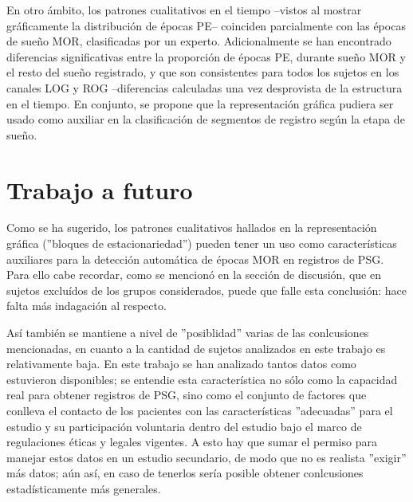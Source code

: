 En otro \'ambito, los
patrones cualitativos en el tiempo --vistos al
mostrar gr\'aficamente la distribuci\'on de \'epocas PE-- coinciden parcialmente con las \'epocas
de sue\~no MOR, clasificadas por un experto.
Adicionalmente se han encontrado diferencias significativas entre la proporci\'on de \'epocas PE,
durante sue\~no MOR y el resto del sue\~no registrado, y que son consistentes para todos los
sujetos en los canales LOG y ROG --diferencias calculadas una vez desprovista de la estructura
en el tiempo. En conjunto, se propone que la representaci\'on gr\'afica pudiera ser usado
como auxiliar en la clasificaci\'on de segmentos de registro seg\'un la etapa de sue\~no.


\section{Trabajo a futuro}

Como se ha sugerido, los patrones cualitativos hallados en la representaci\'on gr\'afica 
(''bloques de estacionariedad'') pueden tener un uso como 
caracter\'isticas auxiliares
para la detecci\'on autom\'atica de \'epocas MOR en registros de PSG.
Para ello cabe recordar, como se mencion\'o 
en la secci\'on de discusi\'on, que en sujetos exclu\'idos de los grupos considerados, puede
que falle esta conclusi\'on: hace falta m\'as indagaci\'on al respecto. 


As\'i tambi\'en se mantiene a nivel de ''posiblidad'' varias de las conlcusiones mencionadas,
en cuanto a la cantidad de sujetos analizados en este trabajo es relativamente baja.
En este trabajo se han analizado tantos datos como estuvieron disponibles;
se entendie esta caracter\'istica no s\'olo como la 
capacidad real para obtener registros de PSG, sino como el conjunto de factores que conlleva
el contacto de los pacientes con las caracter\'isticas ''adecuadas'' para el estudio y su
participaci\'on voluntaria dentro del estudio bajo el marco de regulaciones \'eticas y legales 
vigentes. A esto hay que sumar el permiso para manejar estos datos en un estudio secundario,
de modo que no es realista ''exigir'' m\'as datos; a\'un as\'i, en caso de tenerlos ser\'ia
posible obtener conlcusiones estad\'isticamente m\'as generales.

